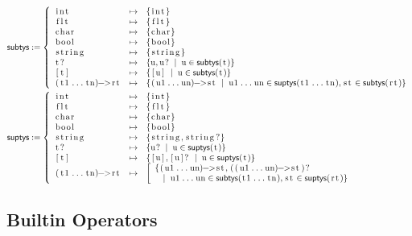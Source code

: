 \documentclass{article}
\newcommand{\code}[1]{\lstinline[columns=fixed]{#1}}
\newcommand{\mc}[1]{\textnormal{\code{#1}}}
\begin{document}
				\begin{align*}
					\mathsf{subtys} &:=
						\left\{
							\begin{array}{lll}
								\mc{int} & \mapsto & \{\mc{int}\}\\
								\mc{flt} & \mapsto & \{\mc{flt}\}\\
								\mc{char} & \mapsto & \{\mc{char}\}\\
								\mc{bool} & \mapsto & \{\mc{bool}\}\\
								\mc{string} & \mapsto & \{\mc{string}\}\\
								\mc{t?} & \mapsto & \{\mc{u},\mc{u?} \;\mid\; \mc{u}\in\mathsf{subtys}(\mc{t})\}\\
								\mc{[t]} & \mapsto & \{\mc{[u]} \;\mid\; \mc{u}\in\mathsf{subtys}(\mc{t})\}\\
								\mc{(t1...tn)->rt} & \mapsto &
									\{\mc{(u1...un)->st} \;\mid\; \mc{u1...un}\in\mathsf{suptys}(\mc{t1...tn}),\mc{st}\in\mathsf{subtys}(\mc{rt})\}
							\end{array}
						\right.\\
					\mathsf{suptys} &:=
						\left\{
							\begin{array}{lll}
								\mc{int} & \mapsto & \{\mc{int}\}\\
								\mc{flt} & \mapsto & \{\mc{flt}\}\\
								\mc{char} & \mapsto & \{\mc{char}\}\\
								\mc{bool} & \mapsto & \{\mc{bool}\}\\
								\mc{string} & \mapsto & \{\mc{string},\mc{string?}\}\\
								\mc{t?} & \mapsto & \{\mc{u?} \;\mid\; \mc{u}\in\mathsf{suptys}(\mc{t})\}\\
								\mc{[t]} & \mapsto & \{\mc{[u]}, \mc{[u]?} \;\mid\; \mc{u}\in\mathsf{suptys}(\mc{t})\}\\
								\mc{(t1...tn)->rt} & \mapsto &
									\left[
									\begin{array}{l}
										\{\mc{(u1...un)->st},\mc{((u1...un)->st)?} \\\ \ \;\mid\; \mc{u1...un}\in\mathsf{subtys}(\mc{t1...tn}),\mc{st}\in\mathsf{suptys}(\mc{rt})\}
									\end{array}
									\right.
							\end{array}
						\right.
				\end{align*}
		
		\subsection{Builtin Operators}
		
\end{document}
